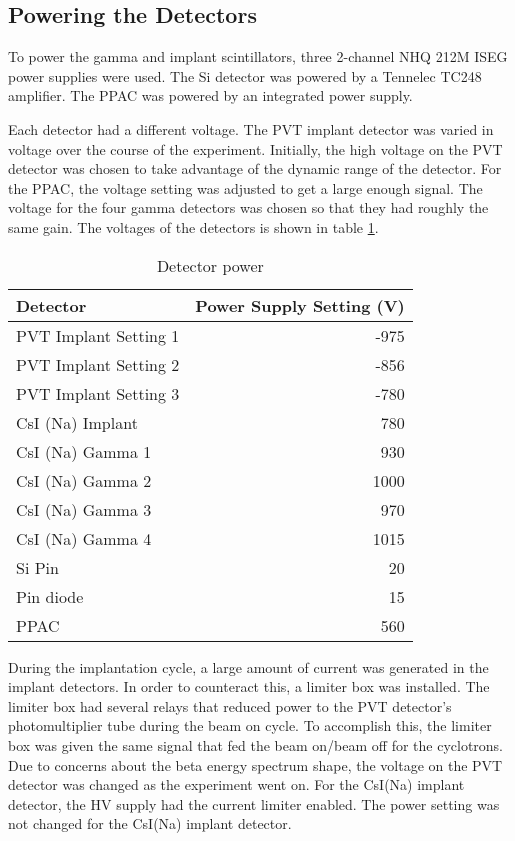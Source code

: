 \documentclass[../MaxHughesThesis.tex]{subfiles}
\begin{document}
\subsection{Powering the Detectors}

To power the gamma and implant scintillators, three 2-channel NHQ 212M ISEG power supplies were used.
The Si detector was powered by a Tennelec TC248 amplifier.
The PPAC was powered by an integrated power supply.

Each detector had a different voltage. 
The PVT implant detector was varied in voltage over the course of the experiment.
Initially, the high voltage on the PVT detector was chosen to take advantage of the dynamic range of the detector.
For the PPAC, the voltage setting was adjusted to get a large enough signal.
The voltage for the four gamma detectors was chosen so that they had roughly the same gain.
The voltages of the detectors is shown in table \ref{tab:detvolt}.
\begin{table}[!hbt]
	\caption{Detector power}
	\centering
		\begin{tabular}{lr}
		Detector & Power Supply Setting (V) \\ \hline
		PVT Implant Setting 1 & -975 \\
		PVT Implant Setting 2 & -856 \\
		PVT Implant Setting 3 & -780 \\
		CsI (Na) Implant & 780 \\ 
		CsI (Na) Gamma 1 & 930 \\
		CsI (Na) Gamma 2 & 1000 \\
		CsI (Na) Gamma 3 & 970 \\
		CsI (Na) Gamma 4 & 1015 \\
		Si Pin & 20 \\
		Pin diode & 15 \\
		PPAC & 560  
		\end{tabular}
	\label{tab:detvolt}
\end{table}

During the implantation cycle, a large amount of current was generated in the implant detectors.
In order to counteract this, a limiter box was installed.
The limiter box had several relays that reduced power to the PVT detector's photomultiplier tube during the beam on cycle. 
To accomplish this, the limiter box was given the same signal that fed the beam on/beam off for the cyclotrons.
Due to concerns about the beta energy spectrum shape, the voltage on the PVT detector was changed as the experiment went on. 
For the CsI(Na) implant detector, the HV supply had the current limiter enabled.
The power setting was not changed for the CsI(Na) implant detector. 
\end{document}
